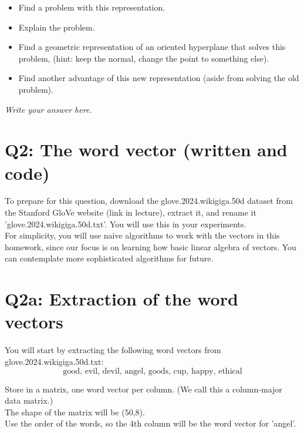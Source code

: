 \documentclass[10pt]{article}
\renewcommand{\(}{\left(}
\renewcommand{\)}{\right)}
\theoremstyle{plain}
\theoremstyle{plain}
\theoremstyle{definition}
\begin{document}
    \begin{itemize}
    \item Find a problem with this representation.
    \item Explain the problem.
    \item Find a geometric representation 
          of an oriented hyperplane that solves this problem,
          (hint: keep the normal, change the point to something else).
    \item Find another advantage of this new representation 
          (aside from solving the old problem).
    \end{itemize}

    \begin{shaded}
     {\em Write your answer here.}
    \end{shaded}

\clearpage

\section*{Q2: The word vector (written and code)}

    To prepare for this question, download the 
      glove.2024.wikigiga.50d dataset from the Stanford GloVe
      website (link in lecture), extract it, and rename it 
      'glove.2024.wikigiga.50d.txt'.
      You will use this in your experiments.\\

      For simplicity, you will use naive algorithms to work with the vectors 
      in this homework,
      since our focus is on learning how basic linear algebra of vectors.
      You can contemplate more sophisticated algorithms for future.

\section*{Q2a: Extraction of the word vectors}

      You will start by extracting the following word vectors 
      from glove.2024.wikigiga.50d.txt:
\[
      \text{good, evil, devil, angel, goods, cup, happy, ethical}
\]

      Store in a matrix, one word vector per column.
      (We call this a column-major data matrix.)\\
      The shape of the matrix will be (50,8).\\
      Use the order of the words, so the 4th column will be the 
      word vector for 'angel'.\\
\end{document}
